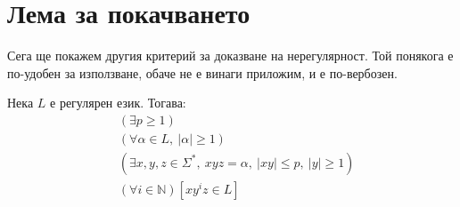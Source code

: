 \section{Лема за покачването}

Сега ще покажем другия критерий за доказване на нерегулярност.
Той понякога е по-удобен за използване, обаче не е винаги приложим, и е по-вербозен.

\begin{lemma}
    Нека $L$ е регулярен език. Тогава:
    \begin{align*}
         & (\exists p \geq 1)                                                             \\
         & (\forall \alpha \in L, \: |\alpha| \geq 1)                                     \\
         & (\exists x, y, z \in \Sigma^*, \: xyz = \alpha, \: |xy| \leq p, \: |y| \geq 1) \\
         & (\forall i \in \mathbb{N}) [xy^iz \in L]
    \end{align*}
\end{lemma}

